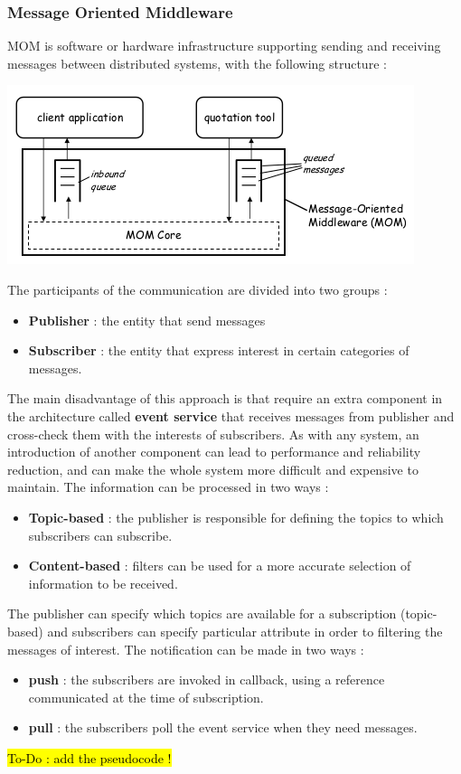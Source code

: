 \documentclass[11pt]{article}
\begin{document}
\subsubsection{Message Oriented Middleware}
MOM is software or hardware infrastructure supporting sending and receiving messages between distributed systems, with the following structure :
\begin{center}
\includegraphics[scale=0.55]{./images/MOM_schema.png}
\end{center}
The participants of the communication are divided into two groups :
\begin{itemize}
\item \textbf{Publisher} : the entity that send messages
\item \textbf{Subscriber} : the entity that express interest in certain categories of messages.
\end{itemize}
The main disadvantage of this approach is that require an extra component in the architecture called \textbf{event service} that receives messages from publisher and cross-check them with the interests of subscribers. As with any system, an introduction of another component can lead to performance and reliability reduction, and can make the whole system more difficult and expensive to maintain. The information can be processed in two ways :
\begin{itemize}
\item \textbf{Topic-based} : the publisher is responsible for defining the topics to which subscribers can subscribe.
\item \textbf{Content-based} : filters can be used for a more accurate selection of information to be received.
\end{itemize}
The publisher can specify which topics are available for a subscription (topic-based) and subscribers can specify particular attribute in order to filtering the messages of interest. 
The notification can be made in two ways :
\begin{itemize}
\item \textbf{push} : the subscribers are invoked in callback, using a reference communicated at the time of subscription.
\item \textbf{pull} : the subscribers poll the event service when they need messages.
\end{itemize}
\hl{To-Do : add the pseudocode !}
\end{document}

